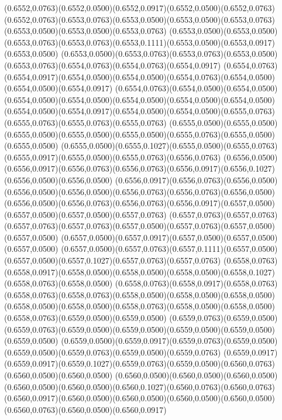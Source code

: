 (0.6552,0.0763)(0.6552,0.0500)(0.6552,0.0917)(0.6552,0.0500)(0.6552,0.0763)
\PST@Solid(0.6552,0.0763)(0.6553,0.0763)(0.6553,0.0500)(0.6553,0.0500)(0.6553,0.0763)(0.6553,0.0500)(0.6553,0.0500)(0.6553,0.0763)
(0.6553,0.0500)(0.6553,0.0500)(0.6553,0.0763)(0.6553,0.0763)(0.6553,0.1111)(0.6553,0.0500)(0.6553,0.0917)(0.6553,0.0500)
(0.6553,0.0500)(0.6553,0.0763)(0.6553,0.0763)(0.6553,0.0500)(0.6553,0.0763)(0.6554,0.0763)(0.6554,0.0763)(0.6554,0.0917)
(0.6554,0.0763)(0.6554,0.0917)(0.6554,0.0500)(0.6554,0.0500)(0.6554,0.0763)(0.6554,0.0500)(0.6554,0.0500)(0.6554,0.0917)
(0.6554,0.0763)(0.6554,0.0500)(0.6554,0.0500)(0.6554,0.0500)(0.6554,0.0500)(0.6554,0.0500)(0.6554,0.0500)(0.6554,0.0500)
(0.6554,0.0500)(0.6554,0.0917)(0.6554,0.0500)(0.6554,0.0500)(0.6555,0.0763)(0.6555,0.0763)(0.6555,0.0763)(0.6555,0.0763)
(0.6555,0.0500)(0.6555,0.0500)(0.6555,0.0500)(0.6555,0.0500)(0.6555,0.0500)(0.6555,0.0763)(0.6555,0.0500)(0.6555,0.0500)
(0.6555,0.0500)(0.6555,0.1027)(0.6555,0.0500)(0.6555,0.0763)(0.6555,0.0917)(0.6555,0.0500)(0.6555,0.0763)(0.6556,0.0763)
(0.6556,0.0500)(0.6556,0.0917)(0.6556,0.0763)(0.6556,0.0763)(0.6556,0.0917)(0.6556,0.1027)(0.6556,0.0500)(0.6556,0.0500)
(0.6556,0.0917)(0.6556,0.0763)(0.6556,0.0500)(0.6556,0.0500)(0.6556,0.0500)(0.6556,0.0763)(0.6556,0.0763)(0.6556,0.0500)
(0.6556,0.0500)(0.6556,0.0763)(0.6556,0.0763)(0.6556,0.0917)(0.6557,0.0500)(0.6557,0.0500)(0.6557,0.0500)(0.6557,0.0763)
(0.6557,0.0763)(0.6557,0.0763)(0.6557,0.0763)(0.6557,0.0763)(0.6557,0.0500)(0.6557,0.0763)(0.6557,0.0500)(0.6557,0.0500)
(0.6557,0.0500)(0.6557,0.0917)(0.6557,0.0500)(0.6557,0.0500)(0.6557,0.0500)
\PST@Solid(0.6557,0.0500)(0.6557,0.0763)(0.6557,0.1111)(0.6557,0.0500)(0.6557,0.0500)(0.6557,0.1027)(0.6557,0.0763)(0.6557,0.0763)
(0.6558,0.0763)(0.6558,0.0917)(0.6558,0.0500)(0.6558,0.0500)(0.6558,0.0500)(0.6558,0.1027)(0.6558,0.0763)(0.6558,0.0500)
(0.6558,0.0763)(0.6558,0.0917)(0.6558,0.0763)(0.6558,0.0763)(0.6558,0.0763)(0.6558,0.0500)(0.6558,0.0500)(0.6558,0.0500)
(0.6558,0.0500)(0.6558,0.0500)(0.6558,0.0763)(0.6558,0.0500)(0.6558,0.0500)(0.6558,0.0763)(0.6559,0.0500)(0.6559,0.0500)
(0.6559,0.0763)(0.6559,0.0500)(0.6559,0.0763)(0.6559,0.0500)(0.6559,0.0500)(0.6559,0.0500)(0.6559,0.0500)(0.6559,0.0500)
(0.6559,0.0500)(0.6559,0.0917)(0.6559,0.0763)(0.6559,0.0500)(0.6559,0.0500)(0.6559,0.0763)(0.6559,0.0500)(0.6559,0.0763)
(0.6559,0.0917)(0.6559,0.0917)(0.6559,0.1027)(0.6559,0.0763)(0.6559,0.0500)(0.6560,0.0763)(0.6560,0.0500)(0.6560,0.0500)
(0.6560,0.0500)(0.6560,0.0500)(0.6560,0.0500)(0.6560,0.0500)(0.6560,0.0500)(0.6560,0.1027)(0.6560,0.0763)(0.6560,0.0763)
(0.6560,0.0917)(0.6560,0.0500)(0.6560,0.0500)(0.6560,0.0500)(0.6560,0.0500)(0.6560,0.0763)(0.6560,0.0500)(0.6560,0.0917)
